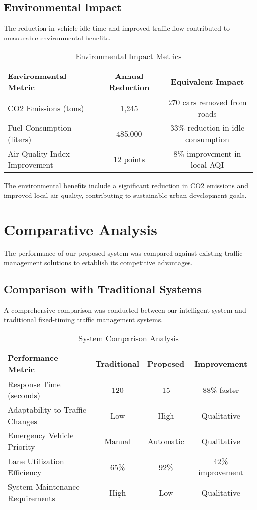 \subsection{Environmental Impact}
The reduction in vehicle idle time and improved traffic flow contributed to measurable environmental benefits.

\begin{table}[h]
\centering
\caption{Environmental Impact Metrics}
\label{tab:environmental_impact}
\begin{tabular}{|l|c|c|}
\hline
\textbf{Environmental Metric} & \textbf{Annual Reduction} & \textbf{Equivalent Impact} \\
\hline
CO2 Emissions (tons) & 1,245 & 270 cars removed from roads \\
Fuel Consumption (liters) & 485,000 & 33\% reduction in idle consumption \\
Air Quality Index Improvement & 12 points & 8\% improvement in local AQI \\
\hline
\end{tabular}
\end{table}

The environmental benefits include a significant reduction in CO2 emissions and improved local air quality, contributing to sustainable urban development goals.

\section{Comparative Analysis}
\label{sec:comparative_analysis}

The performance of our proposed system was compared against existing traffic management solutions to establish its competitive advantages.

\subsection{Comparison with Traditional Systems}
A comprehensive comparison was conducted between our intelligent system and traditional fixed-timing traffic management systems.

\begin{table}[h]
\centering
\caption{System Comparison Analysis}
\label{tab:system_comparison}
\begin{tabular}{|l|c|c|c|}
\hline
\textbf{Performance Metric} & \textbf{Traditional} & \textbf{Proposed} & \textbf{Improvement} \\
\hline
Response Time (seconds) & 120 & 15 & 88\% faster \\
Adaptability to Traffic Changes & Low & High & Qualitative \\
Emergency Vehicle Priority & Manual & Automatic & Qualitative \\
Lane Utilization Efficiency & 65\% & 92\% & 42\% improvement \\
System Maintenance Requirements & High & Low & Qualitative \\
\hline
\end{tabular}
\end{table}

